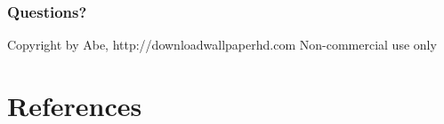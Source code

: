 \documentclass[handout]{beamer}
\begin{document}
        \begin{frame}
            \frametitle{Questions?}

                {Copyright by Abe, http://downloadwallpaperhd.com Non-commercial use only}

        \end{frame}

    \section{References}
\end{document}
